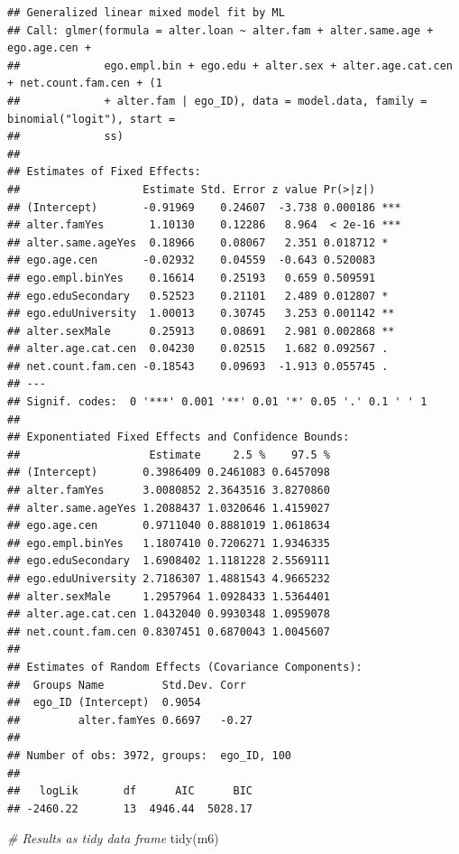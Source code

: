 \documentclass[
]{book}
\newenvironment{Shaded}{\begin{snugshade}}{\end{snugshade}}
\newcommand{\CommentTok}[1]{\textcolor[rgb]{0.56,0.35,0.01}{\textit{#1}}}
\newcommand{\FunctionTok}[1]{\textcolor[rgb]{0.00,0.00,0.00}{#1}}
\newcommand{\NormalTok}[1]{#1}
\begin{document}
\begin{verbatim}
## Generalized linear mixed model fit by ML
## Call: glmer(formula = alter.loan ~ alter.fam + alter.same.age + ego.age.cen +
##             ego.empl.bin + ego.edu + alter.sex + alter.age.cat.cen + net.count.fam.cen + (1
##             + alter.fam | ego_ID), data = model.data, family = binomial("logit"), start =
##             ss)
## 
## Estimates of Fixed Effects:
##                   Estimate Std. Error z value Pr(>|z|)    
## (Intercept)       -0.91969    0.24607  -3.738 0.000186 ***
## alter.famYes       1.10130    0.12286   8.964  < 2e-16 ***
## alter.same.ageYes  0.18966    0.08067   2.351 0.018712 *  
## ego.age.cen       -0.02932    0.04559  -0.643 0.520083    
## ego.empl.binYes    0.16614    0.25193   0.659 0.509591    
## ego.eduSecondary   0.52523    0.21101   2.489 0.012807 *  
## ego.eduUniversity  1.00013    0.30745   3.253 0.001142 ** 
## alter.sexMale      0.25913    0.08691   2.981 0.002868 ** 
## alter.age.cat.cen  0.04230    0.02515   1.682 0.092567 .  
## net.count.fam.cen -0.18543    0.09693  -1.913 0.055745 .  
## ---
## Signif. codes:  0 '***' 0.001 '**' 0.01 '*' 0.05 '.' 0.1 ' ' 1
## 
## Exponentiated Fixed Effects and Confidence Bounds:
##                    Estimate     2.5 %    97.5 %
## (Intercept)       0.3986409 0.2461083 0.6457098
## alter.famYes      3.0080852 2.3643516 3.8270860
## alter.same.ageYes 1.2088437 1.0320646 1.4159027
## ego.age.cen       0.9711040 0.8881019 1.0618634
## ego.empl.binYes   1.1807410 0.7206271 1.9346335
## ego.eduSecondary  1.6908402 1.1181228 2.5569111
## ego.eduUniversity 2.7186307 1.4881543 4.9665232
## alter.sexMale     1.2957964 1.0928433 1.5364401
## alter.age.cat.cen 1.0432040 0.9930348 1.0959078
## net.count.fam.cen 0.8307451 0.6870043 1.0045607
## 
## Estimates of Random Effects (Covariance Components):
##  Groups Name         Std.Dev. Corr 
##  ego_ID (Intercept)  0.9054        
##         alter.famYes 0.6697   -0.27
## 
## Number of obs: 3972, groups:  ego_ID, 100
## 
##   logLik       df      AIC      BIC 
## -2460.22       13  4946.44  5028.17
\end{verbatim}

\begin{Shaded}
\begin{Highlighting}[]
\CommentTok{\# Results as tidy data frame}
\FunctionTok{tidy}\NormalTok{(m6)}
\end{Highlighting}
\end{Shaded}
\end{document}
